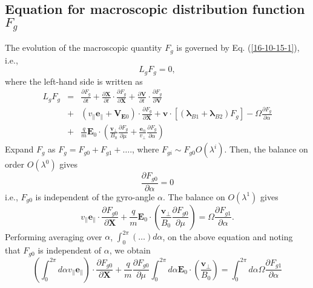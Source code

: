 \documentclass{llncs}
\newcommand{\tmmathbf}[1]{\ensuremath{\boldsymbol{#1}}}
\begin{document}
\subsection{Equation for macroscopic distribution function $F_g$}

The evolution of the macroscopic quantity $F_g$ is governed by Eq.
(\ref{16-10-15-1}), i.e.,
\begin{equation}
  L_g F_g = 0,
\end{equation}
where the left-hand side is written as
\begin{eqnarray*}
  L_g F_g & = & \frac{\partial F_g}{\partial t} + \frac{\partial
  \mathbf{X}}{\partial t} \cdot \frac{\partial F_g}{\partial \mathbf{X}} +
  \frac{\partial \mathbf{V}}{\partial t} \cdot \frac{\partial F_g}{\partial
  \mathbf{V}}\\
  & + & (v_{\parallel} \mathbf{e}_{\parallel} +\mathbf{V}_{\mathbf{E}0})
  \cdot \frac{\partial F_g}{\partial \mathbf{X}} +\mathbf{v} \cdot
  [(\tmmathbf{\lambda}_{B 1} +\tmmathbf{\lambda}_{B 2}) F_g] - \Omega
  \frac{\partial F_g}{\partial \alpha}\\
  & + & \frac{q}{m} \mathbf{E}_0 \cdot \left( \frac{\mathbf{v}_{\perp}}{B_0} 
  \frac{\partial F_g}{\partial \mu} + \frac{\tmmathbf{e}_{\alpha}}{v_{\perp}} 
  \frac{\partial F_g}{\partial \alpha} \right)
\end{eqnarray*}
Expand $F_g$ as $F_g = F_{g 0} + F_{g 1} + \ldots$., where $F_{g i} \sim F_{g
0} O (\lambda^i)$. Then, the balance on order $O (\lambda^0)$ gives
\begin{equation}
  \frac{\partial F_{g 0}}{\partial \alpha} = 0
\end{equation}
i.e., $F_{g 0}$ is independent of the gyro-angle $\alpha$. The balance on $O
(\lambda^1)$ gives
\begin{equation}
  v_{\parallel} \mathbf{e}_{\parallel} \cdot \frac{\partial F_{g 0}}{\partial
  \mathbf{X}} + \frac{q}{m} \mathbf{E}_0 \cdot \left(
  \frac{\mathbf{v}_{\perp}}{B_0}  \frac{\partial F_{g 0}}{\partial \mu}
  \right) = \Omega \frac{\partial F_{g 1}}{\partial \alpha} .
\end{equation}
Performing averaging over $\alpha$, $\int_0^{2 \pi} (\ldots) d \alpha$, on the
above equation and noting that $F_{g 0}$ is independent of $\alpha$, we obtain
\begin{equation}
  \label{17-5-15-4} \left( \int_0^{2 \pi} d \alpha v_{\parallel}
  \mathbf{e}_{\parallel} \right) \cdot \frac{\partial F_{g 0}}{\partial
  \mathbf{X}} + \frac{q}{m} \frac{\partial F_{g 0}}{\partial \mu} \int_0^{2
  \pi} d \alpha \mathbf{E}_0 \cdot \left( \frac{\mathbf{v}_{\perp}}{B_0} 
  \right) = \int_0^{2 \pi} d \alpha \Omega \frac{\partial F_{g 1}}{\partial
  \alpha}
\end{equation}
\end{document}
